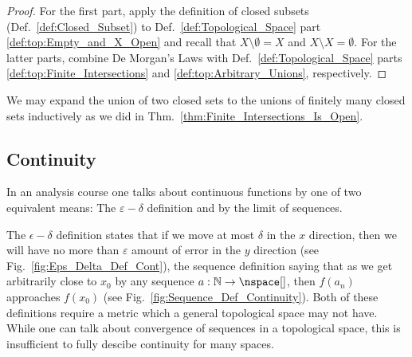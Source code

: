         \begin{proof}
            For the first part, apply the definition of closed subsets
            (Def.~\ref{def:Closed_Subset}) to
            Def.~\ref{def:Topological_Space} part
            \ref{def:top:Empty_and_X_Open} and recall that
            $X\setminus\emptyset=X$ and $X\setminus{X}=\emptyset$. For
            the latter parts, combine De Morgan's Laws with
            Def.~\ref{def:Topological_Space} parts
            \ref{def:top:Finite_Intersections} and
            \ref{def:top:Arbitrary_Unions}, respectively.
        \end{proof}
        We may expand the union of two closed sets to the unions of
        finitely many closed sets inductively as we did in
        Thm.~\ref{thm:Finite_Intersections_Is_Open}.
    \subsection{Continuity}
        In an analysis course one talks about continuous functions by
        one of two equivalent means: The $\varepsilon-\delta$ definition
        and by the limit of sequences.
        \par\hfill\par
        \begin{minipage}[t]{0.50\textwidth}
            The $\epsilon-\delta$ definition states that if we move at
            most $\delta$ in the $x$ direction, then we will have no
            more than $\varepsilon$ amount of error in the $y$
            direction (see Fig.~\ref{fig:Eps_Delta_Def_Cont}), the
            sequence definition saying that as we get arbitrarily close
            to $x_{0}$ by any sequence
            $a:\mathbb{N}\rightarrow\nspace[]$, then $f(a_{n})$
            approaches $f(x_{0})$
            (see Fig.~\ref{fig:Sequence_Def_Continuity}). Both of these
            definitions require a metric which a general topological
            space may not have. While one can talk about convergence of
            sequences in a topological space, this is insufficient to
            fully descibe continuity for many spaces.
        \end{minipage}
        \hfill
